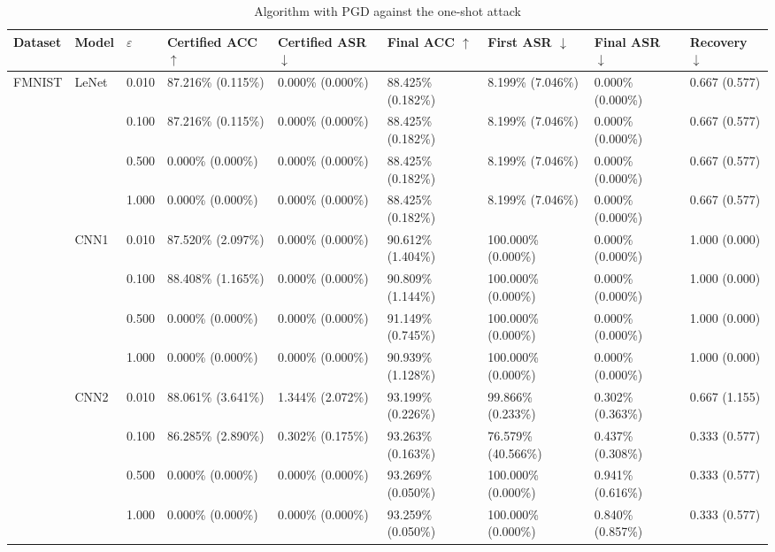 \documentclass[conference,compsoc]{IEEEtran}
\begin{document}
\begin{landscape}
\begin{table}[H]
\centering
\caption{Algorithm with PGD against the one-shot attack}
\begin{tabular}{lllllllll}
\hline
\textbf{Dataset} & \textbf{Model} & $\varepsilon$ & \textbf{Certified ACC} $\uparrow$ & \textbf{Certified ASR} $\downarrow$ & \textbf{Final ACC} $\uparrow$ & \textbf{First ASR} $\downarrow$ & \textbf{Final ASR} $\downarrow$ & \textbf{Recovery} $\downarrow$ \\
\hline
\multirow{12}{*}{FMNIST} & \multirow{4}{*}{LeNet} & 0.010 & 87.216\% (0.115\%) & 0.000\% (0.000\%) & 88.425\% (0.182\%) & 8.199\% (7.046\%) & 0.000\% (0.000\%) & 0.667 (0.577) \\
& & 0.100 & 87.216\% (0.115\%) & 0.000\% (0.000\%) & 88.425\% (0.182\%) & 8.199\% (7.046\%) & 0.000\% (0.000\%) & 0.667 (0.577) \\
& & 0.500 & 0.000\% (0.000\%) & 0.000\% (0.000\%) & 88.425\% (0.182\%) & 8.199\% (7.046\%) & 0.000\% (0.000\%) & 0.667 (0.577) \\
& & 1.000 & 0.000\% (0.000\%) & 0.000\% (0.000\%) & 88.425\% (0.182\%) & 8.199\% (7.046\%) & 0.000\% (0.000\%) & 0.667 (0.577) \\
\cline{2-9}
& \multirow{4}{*}{CNN1} & 0.010 & 87.520\% (2.097\%) & 0.000\% (0.000\%) & 90.612\% (1.404\%) & 100.000\% (0.000\%) & 0.000\% (0.000\%) & 1.000 (0.000) \\
& & 0.100 & 88.408\% (1.165\%) & 0.000\% (0.000\%) & 90.809\% (1.144\%) & 100.000\% (0.000\%) & 0.000\% (0.000\%) & 1.000 (0.000) \\
& & 0.500 & 0.000\% (0.000\%) & 0.000\% (0.000\%) & 91.149\% (0.745\%) & 100.000\% (0.000\%) & 0.000\% (0.000\%) & 1.000 (0.000) \\
& & 1.000 & 0.000\% (0.000\%) & 0.000\% (0.000\%) & 90.939\% (1.128\%) & 100.000\% (0.000\%) & 0.000\% (0.000\%) & 1.000 (0.000) \\
\cline{2-9}
& \multirow{4}{*}{CNN2} & 0.010 & 88.061\% (3.641\%) & 1.344\% (2.072\%) & 93.199\% (0.226\%) & 99.866\% (0.233\%) & 0.302\% (0.363\%) & 0.667 (1.155) \\
& & 0.100 & 86.285\% (2.890\%) & 0.302\% (0.175\%) & 93.263\% (0.163\%) & 76.579\% (40.566\%) & 0.437\% (0.308\%) & 0.333 (0.577) \\
& & 0.500 & 0.000\% (0.000\%) & 0.000\% (0.000\%) & 93.269\% (0.050\%) & 100.000\% (0.000\%) & 0.941\% (0.616\%) & 0.333 (0.577) \\
& & 1.000 & 0.000\% (0.000\%) & 0.000\% (0.000\%) & 93.259\% (0.050\%) & 100.000\% (0.000\%) & 0.840\% (0.857\%) & 0.333 (0.577) \\

\end{tabular}
\end{table}
\end{landscape}
\end{document}
